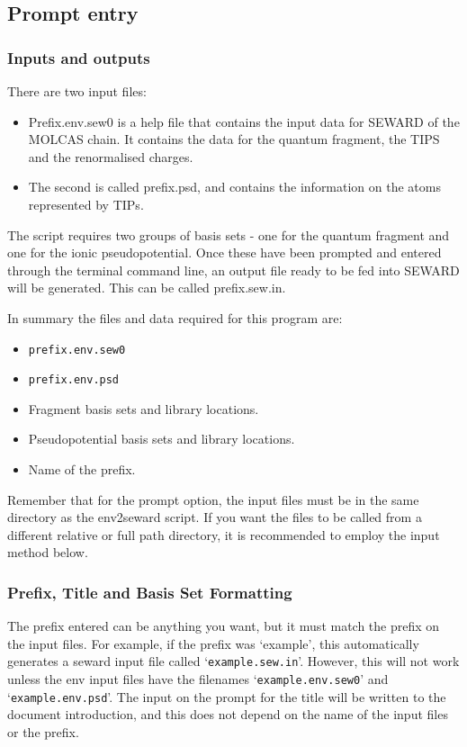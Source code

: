 \subsection{Prompt entry}
\subsubsection{Inputs and outputs}
There are two input files:

\begin{itemize}
	\item Prefix.env.sew0 is a help file that contains the input data for SEWARD of the MOLCAS chain. It contains the data for the quantum fragment, the TIPS and the renormalised charges.
	\item The second is called prefix.psd, and contains the information on the atoms represented by TIPs.
\end{itemize}
 The script requires two groups of basis sets - one for the quantum fragment and one for the ionic pseudopotential. Once these have been prompted and entered through the terminal command line, an output file ready to be fed into SEWARD will be generated. This can be called prefix.sew.in.

In summary the files and data required for this program are:
\begin{itemize}
	\item \texttt{prefix.env.sew0}
	\item \texttt{prefix.env.psd}
	\item Fragment basis sets and library locations.
	\item Pseudopotential basis sets and library locations.
	\item Name of the prefix.
\end{itemize}
Remember that for the prompt option, the input files must be in the same directory as the env2seward script. If you want the files to be called from a different relative or full path directory, it is recommended to employ the input method below.

\subsubsection{Prefix, Title and Basis Set Formatting}

The prefix entered can be anything you want, but it must match the prefix on the input files. For example, if the prefix was `example', this automatically generates a seward input file called `\texttt{example.sew.in}'. However, this will not work unless the env input files have the filenames `\texttt{example.env.sew0}' and `\texttt{example.env.psd}'. The input on the prompt for the title will be written to the document introduction, and this does not depend on the name of the input files or the prefix.

